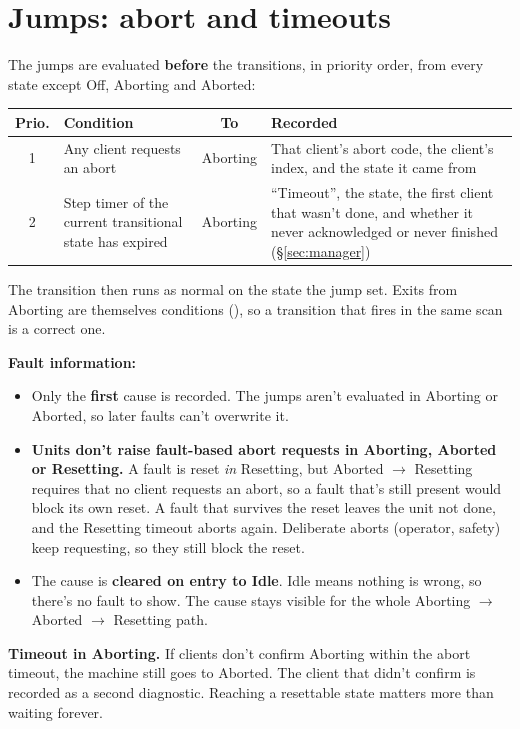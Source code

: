\documentclass[11pt,a4paper]{report}
\DeclareRobustCommand{\code}[1]{\texttt{\detokenize{#1}}}
\begin{document}
\section{Jumps: abort and timeouts}\label{sec:jumps}

The jumps are evaluated \textbf{before} the transitions, in priority order, from every state
except Off, Aborting and Aborted:

\begin{xltabular}{\linewidth}{c P{4.6cm} c L}
\toprule
\textbf{Prio.} & \textbf{Condition} & \textbf{To} & \textbf{Recorded} \\
 & Any client requests an abort & Aborting & That client's abort code, the client's index, and the state it came from \\
2 & Step timer of the current transitional state has expired & Aborting & ``Timeout'', the state, the first client that wasn't done, and whether it never acknowledged or never finished (\S\ref{sec:manager}) \\
\bottomrule
\end{xltabular}

The transition \code{CASE} then runs as normal on the state the jump set. Exits from Aborting
are themselves conditions (\code{AllDone}), so a transition that fires in the same scan is a
correct one.

\textbf{Fault information:}
\begin{itemize}
  \item Only the \textbf{first} cause is recorded. The jumps aren't evaluated in Aborting or
        Aborted, so later faults can't overwrite it.
  \item \textbf{Units don't raise fault-based abort requests in Aborting, Aborted or Resetting.}
        A fault is reset \emph{in} Resetting, but Aborted $\rightarrow$ Resetting requires that no
        client requests an abort, so a fault that's still present would block its own reset. A
        fault that survives the reset leaves the unit not done, and the Resetting timeout aborts
        again. Deliberate aborts (operator, safety) keep requesting, so they still block the
        reset.
  \item The cause is \textbf{cleared on entry to Idle}. Idle means nothing is wrong, so there's
        no fault to show. The cause stays visible for the whole Aborting $\rightarrow$ Aborted
        $\rightarrow$ Resetting path.
\end{itemize}

\textbf{Timeout in Aborting.} If clients don't confirm Aborting within the abort timeout, the
machine still goes to Aborted. The client that didn't confirm is recorded as a second
diagnostic. Reaching a resettable state matters more than waiting forever.
\end{document}
